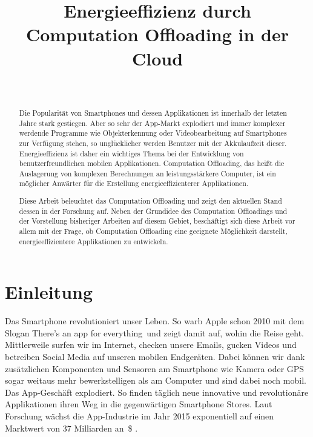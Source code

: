 \documentclass{sigchi}
\begin{document}
\title{Energieeffizienz durch Computation Offloading in der Cloud}

\author{
  \\
}

\maketitle

\begin{abstract}

Die Popularität von Smartphones und dessen Applikationen ist innerhalb der letzten Jahre stark gestiegen.
Aber so sehr der App-Markt explodiert und immer komplexer werdende Programme wie Objekterkennung oder Videobearbeitung auf Smartphones zur Verfügung stehen, so unglücklicher werden Benutzer mit der Akkulaufzeit dieser.
Energieeffizienz ist daher ein wichtiges Thema bei der Entwicklung von benutzerfreundlichen mobilen Applikationen.
Computation Offloading, das heißt die Auslagerung von komplexen Berechnungen an leistungsstärkere Computer, ist ein möglicher Anwärter für die Erstellung energieeffizienterer Applikationen.

Diese Arbeit beleuchtet das Computation Offloading und zeigt den aktuellen Stand dessen in der Forschung auf.
Neben der Grundidee des Computation Offloadings und der Vorstellung bisheriger Arbeiten auf diesem Gebiet, beschäftigt sich diese Arbeit vor allem mit der Frage, ob Computation Offloading eine geeignete Möglichkeit darstellt, energieeffizientere Applikationen zu entwickeln.
\end{abstract}

\section{Einleitung}

Das Smartphone revolutioniert unser Leben.
So warb Apple schon 2010 mit dem Slogan \glqq There's an app for everything\grqq\ und zeigt damit auf, wohin die Reise geht.
Mittlerweile surfen wir im Internet, checken unsere Emails, gucken Videos und betreiben Social Media auf unseren mobilen Endgeräten.
Dabei können wir dank zusätzlichen Komponenten und Sensoren am Smartphone wie Kamera oder GPS sogar weitaus mehr bewerkstelligen als am Computer und sind dabei noch mobil.
Das App-Geschäft explodiert.
So finden täglich neue innovative und revolutionäre Applikationen ihren Weg in die gegenwärtigen Smartphone Stores.
Laut Forschung wächst die App-Industrie im Jahr 2015 exponentiell auf einen Marktwert von 37 Milliarden an~\$ \cite{e3-1}.
\end{document}
